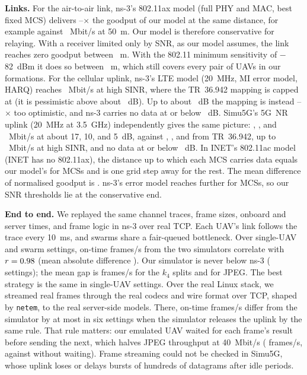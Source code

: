 \documentclass[journal,twocolumn,10pt]{IEEEtran}
\begin{document}
\textbf{Links.} For the air-to-air link, ns-3's 802.11ax model (full PHY and MAC, best fixed MCS) delivers \ValAtwoARatioMin--\ValAtwoARatioMax$\times$ the goodput of our model at the same distance, for example \ValAtwoANsFifty{} against \ValAtwoAModelFifty~Mbit/s at 50~m. Our model is therefore conservative for relaying. With a receiver limited only by SNR, as our model assumes, the link reaches zero goodput between \ValAtwoASnrRange~m. With the 802.11 minimum sensitivity of $-$82~dBm it does so between \ValAtwoAStdRange~m, which still covers every pair of UAVs in our formations. For the cellular uplink, ns-3's LTE model (20~MHz, MI error model, HARQ) reaches \ValLteNsPeak~Mbit/s at high SINR, where the TR~36.942 mapping is capped at \ValLteModelPeak{} (it is pessimistic above about \ValLtePessimisticSinrMin~dB). Up to about \ValLteOptimisticSinrMax~dB the mapping is instead \ValLteOptimisticMin--\ValLteOptimisticMax$\times$ too optimistic, and ns-3 carries no data at or below \ValLteCutoffDb~dB. Simu5G's 5G~NR uplink (20~MHz at 3.5~GHz) independently gives the same picture: \ValNrSeventeen, \ValNrTen, and \ValNrFive~Mbit/s at about 17, 10, and 5~dB, against \ValNrSeventeenModel, \ValNrTenModel, and \ValNrFiveModel{} from TR~36.942, up to \ValNrPeak~Mbit/s at high SINR, and no data at or below \ValNrCutoffDb~dB. In INET's 802.11ac model (INET has no 802.11ax), the distance up to which each MCS carries data equals our model's for \ValInetRangeSame{} MCSs and is one grid step away for the rest. The mean difference of normalised goodput is \ValInetNormDiff. ns-3's error model reaches further for \ValInetNsLonger{} MCSs, so our SNR thresholds lie at the conservative end.

\textbf{End to end.} We replayed the same channel traces, frame sizes, onboard and server times, and frame logic in ns-3 over real TCP. Each UAV's link follows the trace every 10~ms, and swarms share a fair-queued bottleneck. Over \ValStreamSettings{} single-UAV and swarm settings, on-time frames/s from the two simulators correlate with $r=0.98$ (mean absolute difference \ValStreamMeanAbsDiff{}). Our simulator is never below ns-3 (\ValStreamPyAtLeastNs{} settings); the mean gap is \ValStreamSplitGap{} frames/s for the $k_4$ splits and \ValStreamJpegGap{} for JPEG. The best strategy is the same in \ValStreamBestAgrees{} single-UAV settings. Over the real Linux stack, we streamed real frames through the real codecs and wire format over TCP, shaped by \texttt{netem}, to the real server-side models. There, on-time frames/s differ from the simulator by at most \ValEmuMaxDiff{} in six settings when the simulator releases the uplink by the same rule. That rule matters: our emulated UAV waited for each frame's result before sending the next, which halves JPEG throughput at 40~Mbit/s (\ValEmuJpegFortyEmu{} frames/s, against \ValEmuJpegFortyNoAck{} without waiting). Frame streaming could not be checked in Simu5G, whose uplink loses or delays bursts of hundreds of datagrams after idle periods.
\end{document}
